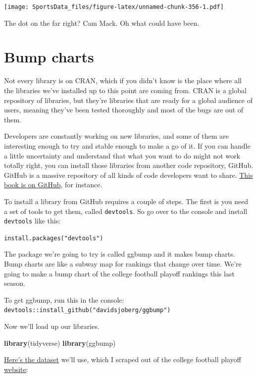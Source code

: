 \documentclass[
]{book}
\newenvironment{Shaded}{\begin{snugshade}}{\end{snugshade}}
\newcommand{\KeywordTok}[1]{\textcolor[rgb]{0.13,0.29,0.53}{\textbf{#1}}}
\newcommand{\NormalTok}[1]{#1}
\begin{document}
\texttt{[image: SportsData\_files/figure-latex/unnamed-chunk-356-1.pdf]}

The dot on the far right? Cam Mack. Oh what could have been.

\hypertarget{bump-charts}{%
\chapter{Bump charts}\label{bump-charts}}

Not every library is on CRAN, which if you didn't know is the place where all the libraries we've installed up to this point are coming from. CRAN is a global repository of libraries, but they're libraries that are ready for a global audience of users, meaning they've been tested thoroughly and most of the bugs are out of them.

Developers are constantly working on new libraries, and some of them are interesting enough to try and stable enough to make a go of it. If you can handle a little uncertainty and understand that what you want to do might not work totally right, you can install those libraries from another code repository, GitHub. GitHub is a massive repository of all kinds of code developers want to share. \href{https://github.com/mattwaite/sportsdatabook}{This book is on GitHub}, for instance.

To install a library from GitHub requires a couple of steps. The first is you need a set of tools to get them, called \texttt{devtools}. So go over to the console and install \texttt{devtools} like this:

\texttt{install.packages("devtools")}

The package we're going to try is called ggbump and it makes bump charts. Bump charts are like a subway map for rankings that change over time. We're going to make a bump chart of the college football playoff rankings this last season.

To get ggbump, run this in the console: \texttt{devtools::install\_github("davidsjoberg/ggbump")}

Now we'll load up our libraries.

\begin{Shaded}
\begin{Highlighting}[]
\KeywordTok{library}\NormalTok{(tidyverse)}
\KeywordTok{library}\NormalTok{(ggbump)}
\end{Highlighting}
\end{Shaded}

\href{https://unl.box.com/s/18mzeypa3pgg5pw2xxgawfbhyryo3z3a}{Here's the dataset} we'll use, which I scraped out of the college football playoff \href{https://collegefootballplayoff.com/rankings.aspx}{website}:
\end{document}
